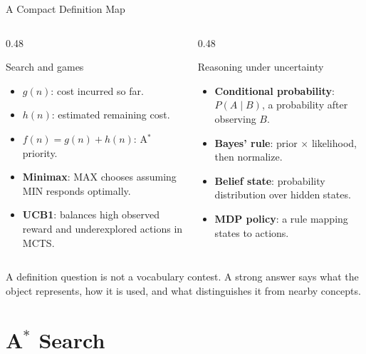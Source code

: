 \documentclass[aspectratio=169,10pt]{beamer}
\begin{document}
\begin{frame}{A Compact Definition Map}
  \small
  \begin{columns}[T,onlytextwidth]
    \begin{column}{0.48\textwidth}
      \begin{block}{Search and games}
        \begin{itemize}
          \item $g(n)$: cost incurred so far.
          \item $h(n)$: estimated remaining cost.
          \item $f(n)=g(n)+h(n)$: A$^*$ priority.
          \item \textbf{Minimax}: MAX chooses assuming MIN responds optimally.
          \item \textbf{UCB1}: balances high observed reward and underexplored actions in MCTS.
        \end{itemize}
      \end{block}
    \end{column}
    \begin{column}{0.48\textwidth}
      \begin{block}{Reasoning under uncertainty}
        \begin{itemize}
          \item \textbf{Conditional probability}: $P(A\mid B)$, a probability after observing $B$.
          \item \textbf{Bayes' rule}: prior $\times$ likelihood, then normalize.
          \item \textbf{Belief state}: probability distribution over hidden states.
          \item \textbf{MDP policy}: a rule mapping states to actions.
        \end{itemize}
      \end{block}
    \end{column}
  \end{columns}
  \begin{keyidea}
    A definition question is not a vocabulary contest. A strong answer says what the object represents, how it is used, and what distinguishes it from nearby concepts.
  \end{keyidea}
\end{frame}

\section{A$^*$ Search}
\end{document}
